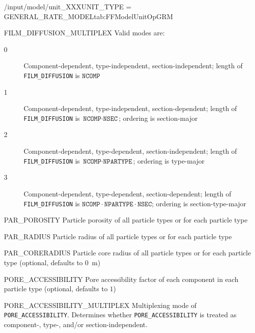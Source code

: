 \begin{condsubgroup}{/input/model/unit\_XXX}{UNIT\_TYPE = GENERAL\_RATE\_MODEL}{tab:FFModelUnitOpGRM}
\begin{dataset}[unit=--,type=int,range={$\{0, \dots, 3 \}$},length={1}]{FILM\_DIFFUSION\_MULTIPLEX}
    Valid modes are:
    \begin{description}
      \item[0] Component-dependent, type-independent, section-independent; length of \texttt{FILM\_DIFFUSION} is $\texttt{NCOMP}$
      \item[1] Component-dependent, type-independent, section-dependent; length of \texttt{FILM\_DIFFUSION} is $\texttt{NCOMP} \cdot \texttt{NSEC}$; ordering is section-major
      \item[2] Component-dependent, type-dependent, section-independent; length of \texttt{FILM\_DIFFUSION} is $\texttt{NCOMP} \cdot \texttt{NPARTYPE}$; ordering is type-major
      \item[3] Component-dependent, type-dependent, section-dependent; length of \texttt{FILM\_DIFFUSION} is $\texttt{NCOMP} \cdot \texttt{NPARTYPE} \cdot \texttt{NSEC}$; ordering is section-type-major
    \end{description}\vspace{-\baselineskip}
  \end{dataset}
  \begin{dataset}[unit=--,type=double,range={$(0,1]$},length={$1$ / \texttt{NPARTYPE}}]{PAR\_POROSITY}
    Particle porosity of all particle types or for each particle type
  \end{dataset}
  \begin{dataset}[unit=\si{\metre},type=double,range={$>0$},length={$1$ / \texttt{NPARTYPE}}]{PAR\_RADIUS}
    Particle radius of all particle types or for each particle type
  \end{dataset}
  \begin{dataset}[unit=\si{\metre},type=double,range={$[0, \texttt{PAR\_RADIUS})$},length={$1$ / \texttt{NPARTYPE}}]{PAR\_CORERADIUS}
    Particle core radius of all particle types or for each particle type (optional, defaults to \SI{0}{\metre})
  \end{dataset}
  \begin{dataset}[unit=--,type=double,range={$(0, 1]$},length={see \texttt{PORE\_ACCESSIBILITY\_MULTIPLEX}}]{PORE\_ACCESSIBILITY}
    Pore accessibility factor of each component in each particle type (optional, defaults to $1$)
  \end{dataset}
  \begin{dataset}[unit=--,type=int,range={$\{0, \dots, 3 \}$},length={1}]{PORE\_ACCESSIBILITY\_MULTIPLEX}
    Multiplexing mode of \texttt{PORE\_ACCESSIBILITY}.
    Determines whether \texttt{PORE\_ACCESSIBILITY} is treated as component-, type-, and/or section-independent.


\end{dataset}
\end{condsubgroup}
